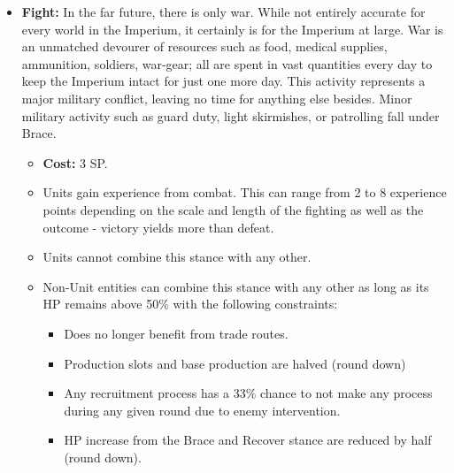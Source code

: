 \begin{itemize}
	\item \textbf{Fight:} In the far future, there is only war. While not entirely accurate for every world in the Imperium, it certainly is for the Imperium at large. War is an unmatched devourer of resources such as food, medical supplies, ammunition, soldiers, war-gear; all are spent in vast quantities every day to keep the Imperium intact for just one more day. 
	This activity represents a major military conflict, leaving no time for anything else besides. Minor military activity such as guard duty, light skirmishes, or patrolling fall under Brace.
	\begin{itemize}
		\item \textbf{Cost:} 3 SP.
		\item Units gain experience from combat. This can range from 2 to 8 experience points depending on the scale and length of the fighting as well as the outcome - victory yields more than defeat.
		\item Units cannot combine this stance with any other.
		\item Non-Unit entities can combine this stance with any other as long as its HP remains above 50\% with the following constraints: 
		\begin{itemize}
			\item Does no longer benefit from trade routes.
			\item Production slots and base production are halved (round down)
			\item Any recruitment process has a 33\% chance to not make any process during any given round due to enemy intervention.
			\item HP increase from the Brace and Recover stance are reduced by half (round down).
		\end{itemize}
	\end{itemize}
	

\end{itemize}
